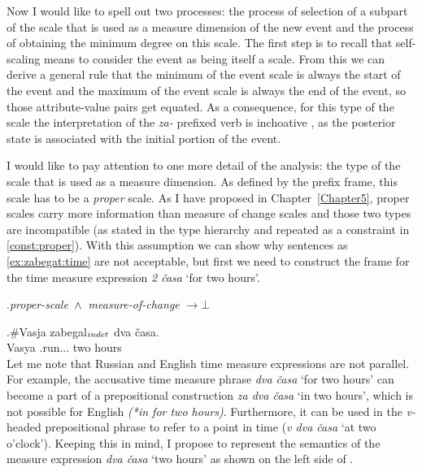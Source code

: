 Now I would like to spell out two processes: the process of selection of a subpart of the scale that is used as a measure dimension of the new event and the process of obtaining the minimum degree on this scale. The first step is to recall that self-scaling means to consider the event as being itself a scale. From this we can derive a general rule that the minimum of the event scale is always the start of the event and the maximum of the event scale is always the end of the event, so those attribute-value pairs get equated. As a consequence, for this type of the scale the interpretation of the \textit{za-}  prefixed verb is inchoative , as the posterior state is associated with the initial portion of the event.

I would like to pay attention to one more detail of the analysis: the type of the scale that is used as a measure dimension. As defined by the prefix frame, this scale has to be a \textit{proper} scale. As I have proposed in Chapter~\ref{Chapter5}, proper scales carry more information than measure of change scales and those two types are incompatible (as stated in the type hierarchy and repeated as a constraint in \ref{const:proper}). With this assumption we can show why sentences as \ref{ex:zabegat:time} are not acceptable, but first we need to construct the frame for the time measure expression  \textit{2 \v{c}asa} `for two hours'. 

\ex.\label{const:proper}\textit{proper-scale} $\,\wedge\,$ \textit{measure-of-change} $\rightarrow \bot$

\exg.\label{ex:zabegat:time}\#Vasja zabegal$_{\normalfont indet}$ dva \v{c}asa.\\
Vasya .run... two hours\\

Let me note that Russian and English time measure expressions are not parallel. For example, the accusative time measure phrase   \textit{dva \v{c}asa} `for two hours' can become a part of a prepositional construction \textit{za dva \v{c}asa} `in two hours', which is not possible for English \textit{(*in for two hours)}. Furthermore, it can be used in the \textit{v-}headed prepositional phrase to refer to a point in time (\textit{v dva \v{c}asa} `at two o'clock'). Keeping this in mind, I propose to represent the semantics of the measure expression \textit{dva \v{c}asa} `two hours' as shown on the left side of . 

